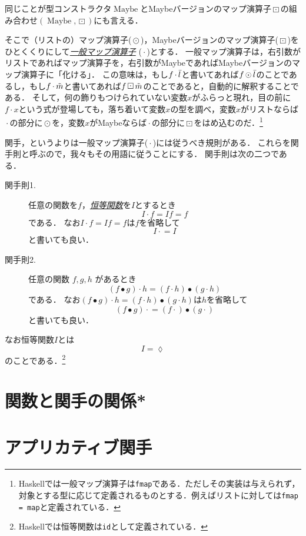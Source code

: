 \documentclass[twocolumn]{jsbook}
\newcommand{\keyword}[1]{\underline{\emph{#1}}}
\newcommand{\code}[1]{\texttt{#1}}
\newcommand{\hsklTypeConstructor}[1]{\mathop{\mathrm{#1}}}
\DeclareMathOperator{\hsklFmap}{\cdot}
\DeclareMathOperator{\hsklMap}{\odot}
\DeclareMathOperator{\hsklMaybeConstructor}{\hsklTypeConstructor{Maybe}}
\DeclareMathOperator{\hsklMaybeMap}{\boxdot}
\newcommand{\hsklList}[1]{\Bar{#1}}
\newcommand{\hsklMaybe}[1]{\Tilde{#1}}
\DeclareMathOperator{\mathCompose}{\bullet}
\newcommand{\mathLambdaAnonymousParameter}{\lozenge}
\begin{document}
同じことが型コンストラクタ$\hsklMaybeConstructor$とMaybeバージョンのマップ演算子$\hsklMaybeMap$の組み合わせ$(\hsklMaybeConstructor,\hsklMaybeMap)$にも言える．

そこで（リストの）マップ演算子($\hsklMap$)，Maybeバージョンのマップ演算子($\hsklMaybeMap$)をひとくくりにして\keyword{一般マップ演算子} ($\hsklFmap$)とする．
一般マップ演算子は，右引数がリストであればマップ演算子を，右引数がMaybeであればMaybeバージョンのマップ演算子に「化ける」．
この意味は，もし$f\hsklFmap\hsklList{l}$と書いてあれば$f\hsklMap\hsklList{l}$のことであるし，もし$f\hsklFmap\hsklMaybe{m}$と書いてあれば$f\hsklMaybeMap\hsklMaybe{m}$のことであると，自動的に解釈することである．
そして，何の飾りもつけられていない変数$x$がふらっと現れ，目の前に$f\hsklFmap x$という式が登場しても，落ち着いて変数$x$の型を調べ，変数$x$がリストならば$\hsklFmap$の部分に$\hsklMap$を，変数$x$がMaybeならば$\hsklFmap$の部分に$\hsklMaybeMap$をはめ込むのだ．\footnote{Haskellでは一般マップ演算子は\code{fmap}である．ただしその実装は与えられず，対象とする型に応じて定義されるものとする．例えばリストに対しては\code{fmap = map}と定義されている．}

関手，というよりは一般マップ演算子($\hsklFmap$)には従うべき規則がある．
これらを関手則と呼ぶので，我々もその用語に従うことにする．
関手則は次の二つである．
\begin{description}
\item[関手則1.] 任意の関数を$f$，\keyword{恒等関数}を$I$とするとき
$$I\hsklFmap f=If=f$$
である．
なお$I\hsklFmap f=If=f$は$f$を省略して
$$I\hsklFmap=I$$
と書いても良い．
\item[関手則2.] 任意の関数 $f,g,h$ があるとき
$$(f\mathCompose g)\hsklFmap h=(f\hsklFmap h)\mathCompose(g\hsklFmap h)$$
である．
なお$(f\mathCompose g)\hsklFmap h=(f\hsklFmap h)\mathCompose(g\hsklFmap h)$は$h$を省略して$$(f\mathCompose g)\hsklFmap=(f\hsklFmap)\mathCompose(g\hsklFmap)$$と書いても良い．
\end{description}
なお恒等関数$I$とは
$$I=\mathLambdaAnonymousParameter$$
のことである．\footnote{Haskellでは恒等関数は\code{id}として定義されている．}

\section{関数と関手の関係*}


\section{アプリカティブ関手}
\end{document}
